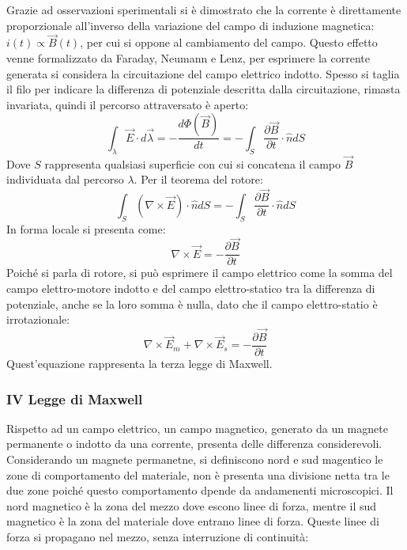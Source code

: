 \documentclass{article}
\numberwithin{equation}{subsection}
\begin{document}
Grazie ad osservazioni sperimentali si è dimostrato che la corrente è direttamente proporzionale all'inverso della variazione del campo di induzione magnetica: 
$i(t)\propto\vec{B}(t)$, per cui si oppone al cambiamento del campo. Questo effetto venne formalizzato da Faraday, Neumann e Lenz, per esprimere la corrente generata 
si considera la circuitazione del campo elettrico indotto. Spesso si taglia il filo per indicare la differenza di potenziale descritta dalla circuitazione, rimasta invariata, 
quindi il percorso attraversato è aperto: 
\begin{equation*}
    \displaystyle\int_{\lambda}\vec{E}\cdot d\vec{\lambda}=-\frac{d\Phi(\vec{B})}{dt}=-\int_S\frac{\partial \vec{B}}{\partial t}\cdot\hat{n}dS
\end{equation*}
Dove $S$ rappresenta qualsiasi superficie con cui si concatena il campo $\vec{B}$ individuata dal percorso $\lambda$. Per il teorema del rotore:
\begin{equation}
    \displaystyle\int_S(\nabla\times\vec{E})\cdot\hat{n}dS=-\int_S\frac{\partial \vec{B}}{\partial t}\cdot\hat{n}dS
\end{equation}
In forma locale si presenta come:
\begin{equation*}
    \nabla\times\vec{E}=\displaystyle-\frac{\partial \vec{B}}{\partial t}
\end{equation*}
Poiché si parla di rotore, si può esprimere il campo elettrico come la somma del campo elettro-motore indotto e del campo elettro-statico tra la differenza di potenziale, 
anche se la loro somma è nulla, dato che il campo elettro-statio è irrotazionale:
\begin{equation}
    \nabla\times\vec{E}_m+\nabla\times\vec{E}_s=-\displaystyle\frac{\partial \vec{B}}{\partial t}
\end{equation} 
Quest'equazione rappresenta la terza legge di Maxwell. 

\subsubsection{IV Legge di Maxwell}

Rispetto ad un campo elettrico, un campo magnetico, generato da un magnete permanente o indotto da una corrente, presenta delle differenza considerevoli. Considerando un 
magnete permanetne, si definiscono nord e sud magentico le zone di comportamento del materiale, non è presenta una divisione netta tra le due zone poiché questo comportamento 
dpende da andamenenti microscopici. Il nord magnetico è la zona del mezzo dove escono linee di forza, mentre il 
sud magnetico è la zona del materiale dove entrano linee di forza. Queste linee di forza si propagano nel mezzo, senza interruzione di continuità:
\end{document}
